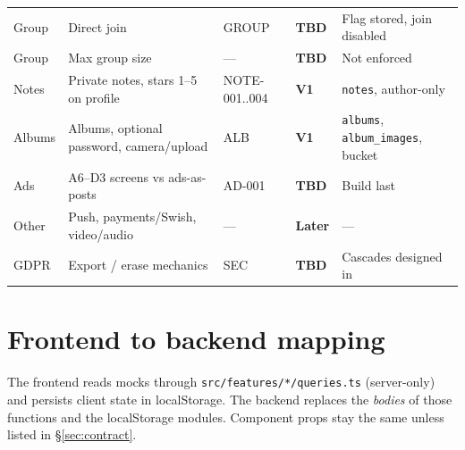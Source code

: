 \documentclass[11pt,a4paper]{article}
\newcommand{\vone}{\textcolor{p0}{\textbf{V1}}}
\newcommand{\later}{\textcolor{p1}{\textbf{Later}}}
\newcommand{\tbd}{\textcolor{tbd}{\textbf{TBD}}}
\newcommand{\code}[1]{\texttt{\small #1}}
\begin{document}
{\begin{longtable}{L{1.9cm} L{5.2cm} L{2.2cm} L{1.1cm} L{4.6cm}}
Group & Direct join & GROUP & \tbd & Flag stored, join disabled\\
Group & Max group size & --- & \tbd & Not enforced\\
Notes & Private notes, stars 1--5 on profile & NOTE-001..004 & \vone & \code{notes}, author-only\\
Albums & Albums, optional password, camera/upload & ALB & \vone & \code{albums}, \code{album\_images}, bucket\\
Ads & A6--D3 screens vs ads-as-posts & AD-001 & \tbd & Build last\\
Other & Push, payments/Swish, video/audio & --- & \later & ---\\
GDPR & Export / erase mechanics & SEC & \tbd & Cascades designed in\\
\end{longtable}
}

\section{Frontend to backend mapping}
The frontend reads mocks through \code{src/features/*/queries.ts} (server-only) and persists client state in
localStorage. The backend replaces the \emph{bodies} of those functions and the localStorage modules.
Component props stay the same unless listed in \S\ref{sec:contract}.
\end{document}
